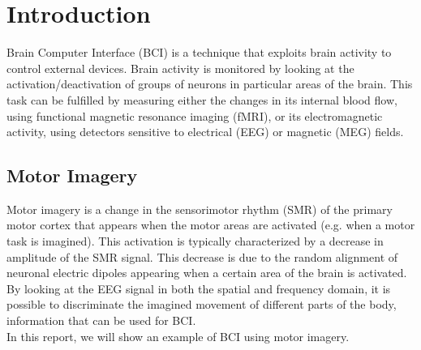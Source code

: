 \section{Introduction}
Brain Computer Interface (BCI) is a technique that exploits brain activity to control external devices.
Brain activity is monitored by looking at the activation/deactivation of groups of neurons in particular areas of the brain.
This task can be fulfilled by measuring either the changes in its internal blood flow, using functional magnetic resonance imaging (fMRI), or its electromagnetic activity, using detectors sensitive to electrical (EEG) or magnetic (MEG) fields.
\subsection{Motor Imagery}
Motor imagery is a change in the sensorimotor rhythm (SMR) of the primary motor cortex that appears when the motor areas are activated (e.g. when a motor task is imagined).
This activation is typically characterized by a decrease in amplitude of the SMR signal.
This decrease is due to the random alignment of neuronal electric dipoles appearing when a certain area of the brain is activated.
By looking at the EEG signal in both the spatial and frequency domain, it is possible to discriminate the imagined movement of different parts of the body, information that can be used for BCI. \\
In this report, we will show an example of BCI using motor imagery.

